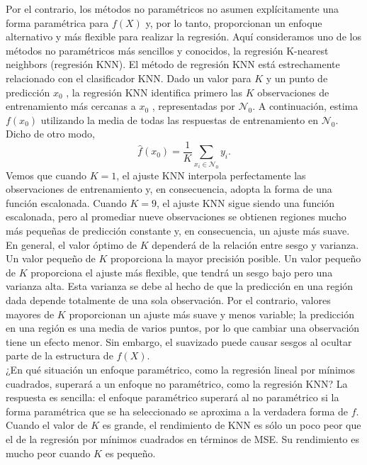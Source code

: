  Por el contrario, los métodos no paramétricos no asumen explícitamente una forma paramétrica para $f(X)$ y, por lo tanto, proporcionan un enfoque alternativo y más flexible para realizar la regresión. Aquí consideramos uno de los métodos no paramétricos más sencillos y conocidos, la regresión K-nearest neighbors (regresión KNN). El método de regresión KNN está estrechamente relacionado con el clasificador KNN. Dado un valor para $K$ y un punto de predicción $x_0$ , la regresión KNN identifica primero las $K$ observaciones de entrenamiento más cercanas a $x_0$ , representadas por $\mathcal{N}_0$. A continuación, estima $f(x_0)$ utilizando la media de todas las respuestas de entrenamiento en $\mathcal{N}_0$. Dicho de otro modo,
 $$\hat{f}(x_0)=\dfrac{1}{K}\sum_{x_i\in \mathcal{N}_0}y_i.$$
 Vemos que cuando $K = 1$, el ajuste KNN interpola perfectamente las observaciones de entrenamiento y, en consecuencia, adopta la forma de una función escalonada. Cuando $K = 9$, el ajuste KNN sigue siendo una función escalonada, pero al promediar nueve observaciones se obtienen regiones mucho más pequeñas de predicción constante y, en consecuencia, un ajuste más suave. En general, el valor óptimo de $K$ dependerá de la relación entre sesgo y varianza. Un valor pequeño de $K$ proporciona la mayor precisión posible. Un valor pequeño de $K$ proporciona el ajuste más flexible, que tendrá un sesgo bajo pero una varianza alta. Esta varianza se debe al hecho de que la predicción en una región dada depende totalmente de una sola observación. Por el contrario, valores mayores de $K$ proporcionan un ajuste más suave y menos variable; la predicción en una región es una media de varios puntos, por lo que cambiar una observación tiene un efecto menor. Sin embargo, el suavizado puede causar sesgos al ocultar parte de la estructura de $f(X)$.\\

 ¿En qué situación un enfoque paramétrico, como la regresión lineal por mínimos cuadrados, superará a un enfoque no paramétrico, como la regresión KNN? La respuesta es sencilla: el enfoque paramétrico superará al no paramétrico si la forma paramétrica que se ha seleccionado se aproxima a la verdadera forma de $f$.\\

 Cuando el valor de $K$ es grande, el rendimiento de KNN es sólo un poco peor que el de la regresión por mínimos cuadrados en términos de MSE. Su rendimiento es mucho peor cuando $K$ es pequeño.\\

